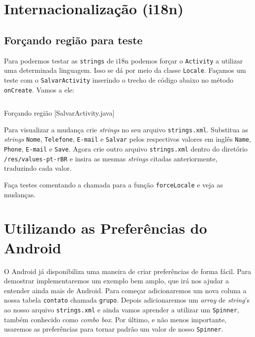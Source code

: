 \section{Internacionalização (i18n)}

\subsection{Forçando região para teste}

Para podermos testar as \texttt{strings} de i18n podemos forçar o \texttt{Activity}
a utilizar uma determinada linguagem. Isso se dá por meio da classe \texttt{Locale}.
Façamos um teste com o \texttt{SalvarActivity} inserindo o trecho de código abaixo no
método \texttt{onCreate}. Vamos a ele:

\begin{listing}[H]
  \inputminted[linenos=true,frame=bottomline,tabsize=3]{ java }{ source/SalvarActivity-5.java }
  \caption{Forçando região [SalvarActivity.java]}
\end{listing}

Para visualizar a mudança crie \textit{strings} no seu arquivo \texttt{strings.xml}. Substitua
as \textit{strings} \texttt{Nome}, \texttt{Telefone}, \texttt{E-mail} e \texttt{Salvar} pelos
respectivos valores em inglês \texttt{Name}, \texttt{Phone}, \texttt{E-mail} e \texttt{Save}.
Agora crie outro arquivo \texttt{strings.xml} dentro do diretório \texttt{/res/values-pt-rBR} e
insira as mesmas \textit{strings} citadas anteriormente, traduzindo cada valor.

Faça testes comentando a chamada para a função \texttt{forceLocale} e veja as mudanças.

\section{Utilizando as Preferências do Android}

O Android já disponibiliza uma maneira de criar preferências de forma fácil. Para demostrar implementaremos
um exemplo bem amplo, que irá nos ajudar a entender ainda mais de Android. Para começar adicionaremos
um nova coluna a nossa tabela \texttt{contato} chamada \texttt{grupo}. Depois adicionaremos um \textit{array}
de \textit{string}'s ao nosso arquivo \texttt{strings.xml} e ainda vamos aprender a utilizar um
\texttt{Spinner}, também conhecido como \textit{combo box}. Por último, e não menos importante, usaremos
as preferências para tornar padrão um valor de nosso \texttt{Spinner}.

